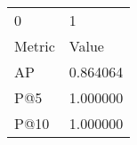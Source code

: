 \begin{tabular}{ll}
0 & 1 \\
Metric & Value \\
AP & 0.864064 \\
P@5 & 1.000000 \\
P@10 & 1.000000 \\
\end{tabular}
